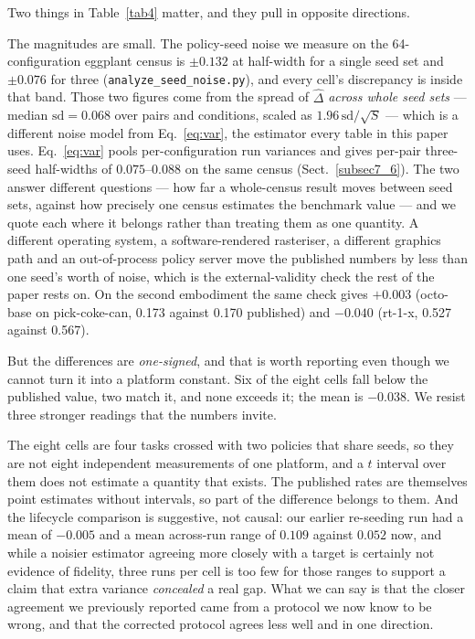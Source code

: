 \documentclass[pdflatex,iicol,sn-apa]{sn-jnl}
\theoremstyle{remark}
\begin{document}
Two things in Table~\ref{tab4} matter, and they pull in opposite directions.

The magnitudes are small. The policy-seed noise we measure on the 64-configuration eggplant census is
$\pm 0.132$ at half-width for a single seed set and $\pm 0.076$ for three
(\texttt{analyze\_seed\_noise.py}), and every cell's discrepancy is inside that band. Those two
figures come from the spread of $\hat\Delta$ \emph{across whole seed sets} --- median
$\mathrm{sd} = 0.068$ over pairs and conditions, scaled as $1.96\,\mathrm{sd}/\sqrt{S}$ --- which is
a different noise model from Eq.~\eqref{eq:var}, the estimator every table in this paper uses. Eq.~\eqref{eq:var}
pools per-configuration run variances and gives per-pair three-seed half-widths of $0.075$--$0.088$
on the same census (Sect.~\ref{subsec7_6}). The two answer different questions --- how far a
whole-census result moves between seed sets, against how precisely one census estimates the benchmark
value --- and we quote each where it belongs rather than treating them as one quantity. A different operating
system, a software-rendered rasteriser, a different graphics path and an out-of-process policy server
move the published numbers by less than one seed's worth of noise, which is the external-validity
check the rest of the paper rests on. On the second embodiment the same check gives $+0.003$
(octo-base on pick-coke-can, 0.173 against 0.170 published) and $-0.040$ (rt-1-x, 0.527 against
0.567).

But the differences are \emph{one-signed}, and that is worth reporting even though we cannot turn it
into a platform constant. Six of the eight cells fall below the published value, two match it, and
none exceeds it; the mean is $-0.038$. We resist three stronger readings that the numbers invite.

The eight cells are four tasks crossed with two policies that share seeds, so they are not eight
independent measurements of one platform, and a $t$ interval over them does not estimate a quantity
that exists. The published rates are themselves point estimates without intervals, so part of the
difference belongs to them. And the lifecycle comparison is suggestive, not causal: our earlier
re-seeding run had a mean of $-0.005$ and a mean across-run range of $0.109$ against $0.052$ now,
and while a noisier estimator agreeing more closely with a target is certainly not evidence of
fidelity, three runs per cell is too few for those ranges to support a claim that extra variance
\emph{concealed} a real gap. What we can say is that the closer agreement we previously reported came
from a protocol we now know to be wrong, and that the corrected protocol agrees less well and in one
direction.
\end{document}
